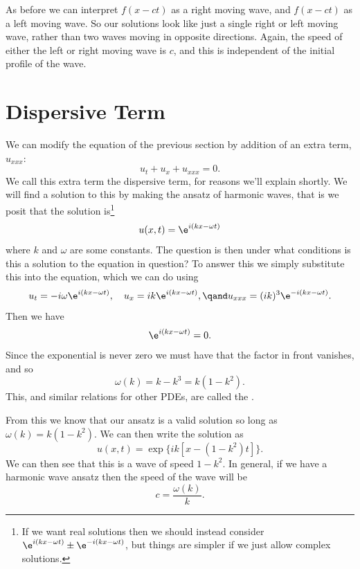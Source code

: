 \documentclass[fleqn]{NotesClass}
\begin{document}
    As before we can interpret \(f(x - ct)\) as a right moving wave, and \(f(x - ct)\) as a left moving wave.
    So our solutions look like just a single right or left moving wave, rather than two waves moving in opposite directions.
    Again, the speed of either the left or right moving wave is \(c\), and this is independent of the initial profile of the wave.
    
    \section{Dispersive Term}
    We can modify the equation of the previous section by addition of an extra term, \(u_{xxx}\):
    \begin{equation}
        u_t + u_x + u_{xxx} = 0.
    \end{equation}
    We call this extra term the dispersive term, for reasons we'll explain shortly.
    We will find a solution to this by making the ansatz of harmonic waves, that is we posit that the solution is\footnote{If we want real solutions then we should instead consider \(\e^{i(kx - \omega t)} \pm \e^{-i(kx - \omega t)}\), but things are simpler if we just allow complex solutions.}
    \begin{equation}
        u(x, t) = \e^{i(kx - \omega t)}
    \end{equation}
    where \(k\) and \(\omega\) are some constants.
    The question is then under what conditions is this a solution to the equation in question?
    To answer this we simply substitute this into the equation, which we can do using
    \begin{equation}
        u_t = -i\omega\e^{i(kx - \omega t)}, \quad u_x = ik\e^{i(kx - \omega t)}, \qand u_{xxx} = (ik)^3\e^{-i(kx - \omega t)}.
    \end{equation}
    Then we have
    \begin{equation}
        [-i\omega + ik - ik^3]\e^{i(kx - \omega t)} = 0.
    \end{equation}
    Since the exponential is never zero we must have that the factor in front vanishes, and so
    \begin{equation}
        \omega(k) = k - k^3 = k(1 - k^2).
    \end{equation}
    This, and similar relations for other PDEs, are called the .
    
    From this we know that our ansatz is a valid solution so long as \(\omega(k) = k(1 - k^2)\).
    We can then write the solution as
    \begin{equation}
        u(x, t) = \exp\{ik[x - (1 - k^2)t]\}.
    \end{equation}
    We can then see that this is a wave of speed \(1 - k^2\).
    In general, if we have a harmonic wave ansatz then the speed of the wave will be
    \begin{equation}
        c = \frac{\omega(k)}{k}.
    \end{equation}
    
\end{document}
